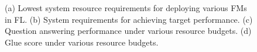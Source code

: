 \begin{figure}
\vspace{-10px}
  \centering
  \vspace{-20px}
  \caption{(a) Lowest system resource requirements for deploying various FMs in FL. 
  (b) System requirements for achieving target performance.
  (c) Question answering performance under various resource budgets.
  (d) Glue score under various resource budgets.
  }
  \label{fig:resoruce_efficiency}
  \vspace{-10px}


\end{figure}
